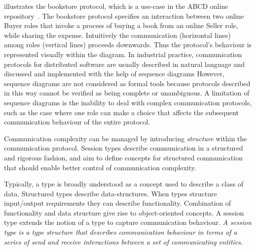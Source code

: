  illustrates the bookstore protocol, which is a use-case
in the ABCD online repository~\cite{usecase_repository}.
The bookstore protocol specifies an interaction between two online Buyer roles
that invoke a process of buying a book from an online Seller role, while
sharing the expense. Intuitively the communication (horizontal lines) among
roles (vertical lines) proceeds downwards.
Thus the protocol's behaviour is represented visually within the diagram.
%
In industrial practice, communication protocols for
distributed software are usually described in natural language and
discussed and implemented with the help of sequence diagrams
However, sequence diagrams are not considered as formal tools because
protocols described in this way cannot be verified as being complete or unambiguous.
A limitation of sequence diagrams is the inability to deal with complex
communication protocols, such as the case where one role
can make a choice that affects the subsequent communication behaviour
of the entire protocol.

Communication complexity can be managed by
introducing \emph{structure} within the communication protocol.
Session types describe communication in a structured and rigorous fashion,
and aim to define concepts for structured communication
that should enable better control of communication complexity.

Typically, a type is broadly understood as a concept used
to describe a class of data. Structured types describe
data-structures. When types structure input/output requirements
they can describe functionality. Combination of functionality
and data structure give rise to object-oriented concepts.
A session type extends
the notion of a type to capture communication behaviour. %
{\em A session type is a type structure that describes communication
	behaviour in terms of a series of send and receive
	interactions between a set of communicating entities.} 

